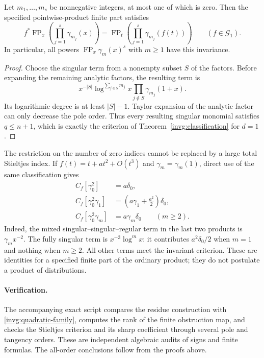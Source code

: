 \begin{corollary}
\label{invg:stieltjes-products}
Let $m_1,\ldots,m_s$ be nonnegative integers, at most one of which is
zero.  Then the specified pointwise-product finite part satisfies
\begin{equation}\label{invg:stieltjes-products-formula}
 f^*\operatorname{FP}_x\!\left(\prod_{j=1}^{s}\gamma_{m_j}(x)\right)
 =\operatorname{FP}_t\!\left(\prod_{j=1}^{s}\gamma_{m_j}(f(t))\right)
 \qquad (f\in\mathscr G_1).
\end{equation}
In particular, all powers $\operatorname{FP}_x\gamma_m(x)^s$ with
$m\ge1$ have this invariance.
\end{corollary}
\begin{proof}
Choose the singular term from a nonempty subset $S$ of the factors.
Before expanding the remaining analytic factors, the resulting term is
\[
 x^{-|S|}\log^{\sum_{j\in S}m_j}x
             \prod_{j\notin S}\gamma_{m_j}(1+x).
\]
Its logarithmic degree is at least $|S|-1$.  Taylor expansion of the
analytic factor can only decrease the pole order.  Thus every resulting
singular monomial satisfies $q\le n+1$, which is exactly the criterion
of Theorem~\ref{invg:classification} for $d=1$.
\end{proof}

The restriction on the number of zero indices cannot be replaced by a
large total Stieltjes index.  If $f(t)=t+a t^2+O(t^3)$ and
$\gamma_m=\gamma_m(1)$, direct use of the same classification gives
\begin{align}
 C_f[\gamma_0^2]&=a\delta_0,\label{invg:product-counter1}\\
 C_f[\gamma_0^2\gamma_1]&=
             \left(a\gamma_1+\frac{a^2}{2}\right)\delta_0,
             \label{invg:product-counter2}\\
 C_f[\gamma_0^2\gamma_m]&=a\gamma_m\delta_0\qquad(m\ge2).
             \label{invg:product-counter3}
\end{align}
Indeed, the mixed singular--singular--regular term in the last two
products is $\gamma_m x^{-2}$.  The fully singular term is
$x^{-3}\log^m x$: it contributes $a^2\delta_0/2$ when $m=1$ and
nothing when $m\ge2$.  All other terms meet the invariant criterion.
These are identities for a specified finite part of the ordinary
product; they do not postulate a product of distributions.

\paragraph{Verification.}
The accompanying exact script compares the residue construction with
\eqref{invg:quadratic-family}, computes the rank of the finite
obstruction map, and checks the Stieltjes criterion and its sharp
coefficient through several pole and tangency orders.  These are
independent algebraic audits of signs and finite formulas.  The
all-order conclusions follow from the proofs above.
